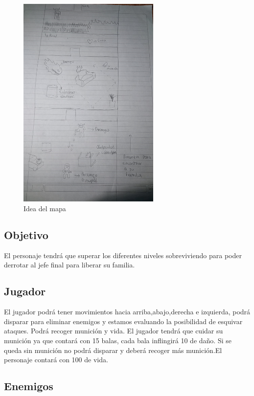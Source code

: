 \documentclass{article}
\begin{document}
\begin{figure}[ht]
\includegraphics[width=7cm]{juego.png}
\centering
\caption{Idea del mapa}
\label{fig:juego}
\end{figure}

\subsection{Objetivo}
El personaje tendrá que superar  los diferentes niveles sobreviviendo para poder derrotar al jefe final para liberar su familia.

\subsection{Jugador}
El jugador podrá tener movimientos hacia arriba,abajo,derecha e izquierda, podrá disparar para eliminar enemigos y estamos evaluando la posibilidad de esquivar ataques.
Podrá recoger munición y vida. El jugador tendrá que cuidar su munición ya que contará con 15 balas, cada bala inflingirá 10 de daño. Si se queda sin munición no podrá disparar y deberá recoger más munición.El personaje contará con 100 de vida.

\subsection{Enemigos}
\end{document}
